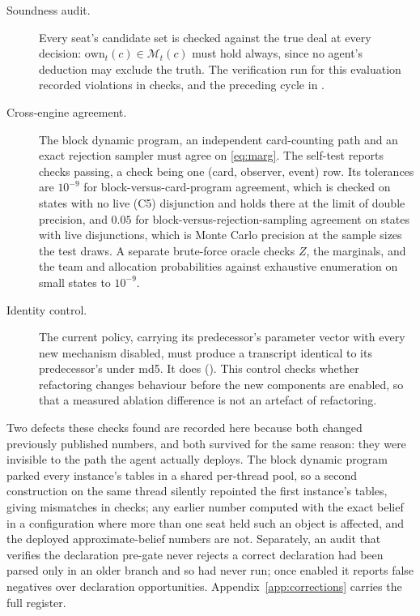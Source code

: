 \begin{description}
\item[Soundness audit.] Every seat's candidate set is checked against the true deal at every
  decision: $\mathrm{own}_t(c) \in \mathcal{M}_t(c)$ must hold always, since no agent's deduction may
  exclude the truth. The verification run for this evaluation recorded
  \vsevenVerifyViolations{} violations in \vsevenVerifyChecks{} checks, and the preceding cycle
  \vsixAuditViolations{} in \vsixAuditChecks{}.
\item[Cross-engine agreement.] The block dynamic program, an independent card-counting path and an
  exact rejection sampler must agree on \eqref{eq:marg}. The self-test reports
  \vsevenSelftestChecks{} checks passing, a check being one (card, observer, event) row. Its
  tolerances are $10^{-9}$ for block-versus-card-program agreement, which is checked on states with
  no live (C5) disjunction and holds there at the limit of double precision, and $0.05$ for
  block-versus-rejection-sampling agreement on states with live disjunctions, which is Monte Carlo
  precision at the sample sizes the test draws. A separate brute-force oracle checks $Z$, the
  marginals, and the team and allocation probabilities against exhaustive enumeration on small
  states to $10^{-9}$.
\item[Identity control.] The current policy, carrying its predecessor's parameter vector with every
  new mechanism disabled, must produce a transcript identical to its predecessor's under md5. It does
  (\vsixIdentity{}). This control checks whether refactoring changes behaviour before the new
  components are enabled, so that a measured ablation difference is not an artefact of refactoring.
\end{description}

Two defects these checks found are recorded here because both changed previously published numbers,
and both survived for the same reason: they were invisible to the path the agent actually deploys.
The block dynamic program parked every instance's tables in a shared per-thread pool, so a second
construction on the same thread silently repointed the first instance's tables, giving
\numAliasMismatch{} mismatches in \numAliasChecks{} checks; any earlier number computed with the
exact belief in a configuration where more than one seat held such an object is affected, and the
deployed approximate-belief numbers are not. Separately, an audit that verifies the declaration
pre-gate never rejects a correct declaration had been parsed only in an older branch and so had never
run; once enabled it reports \vsixGateFalseNeg{} false negatives over \vsixGateOpportunities{}
declaration opportunities. Appendix~\ref{app:corrections} carries the full register.
